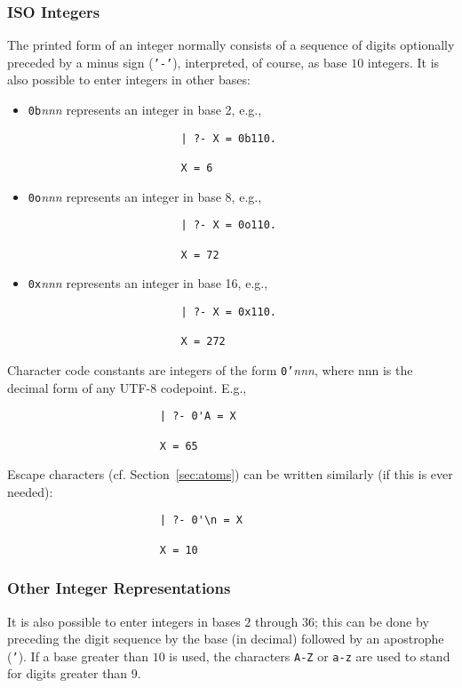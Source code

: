 \subsubsection{ISO Integers}
%
The printed form of an integer normally consists of a sequence of
digits optionally preceded by a minus sign ({\tt '-'}), interpreted,
of course, as base $10$ integers.  It is also possible to enter
integers in other bases: 
\begin{itemize}
\item {\tt 0b}{\em nnn} represents an integer in base 2, e.g., 
\begin{verbatim}
                        | ?- X = 0b110.

                        X = 6
\end{verbatim}

\item {\tt 0o}{\em nnn} represents an integer in base 8, e.g., 
\begin{verbatim}
                        | ?- X = 0o110.

                        X = 72
\end{verbatim}

\item {\tt 0x}{\em nnn} represents an integer in base 16, e.g., 
\begin{verbatim}
                        | ?- X = 0x110.

                        X = 272
\end{verbatim}
\end{itemize}
Character code constants are integers of the form {\tt 0'}{\em nnn},
where nnn is the decimal form of any UTF-8 codepoint.  E.g.,
\begin{verbatim}
                        | ?- 0'A = X

                        X = 65
\end{verbatim}
Escape characters (cf. Section~\ref{sec:atoms}) can be written
similarly (if this is ever needed):
\begin{verbatim}
                        | ?- 0'\n = X

                        X = 10
\end{verbatim}

\subsubsection{Other Integer Representations}

It is also possible to enter integers in bases $2$ through $36$; this
can be done by preceding the digit sequence by the base (in decimal)
followed by an apostrophe ({\tt '}).  If a base greater than $10$ is
used, the characters {\tt A-Z} or {\tt a-z} are used to stand for
digits greater than $9$.

